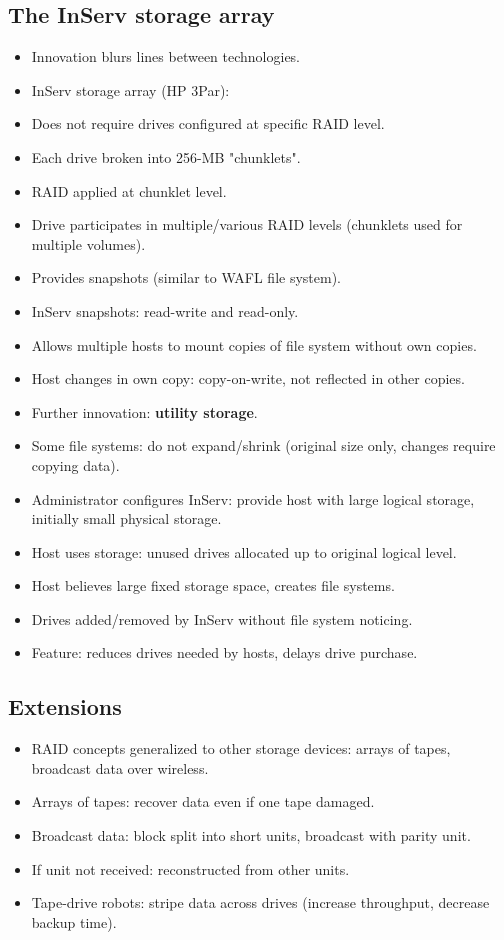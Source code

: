 \subsection{The InServ storage array}
\begin{itemize}
    \item Innovation blurs lines between technologies.
    \item InServ storage array (HP 3Par):
    \item Does not require drives configured at specific RAID level.
    \item Each drive broken into 256-MB "chunklets".
    \item RAID applied at chunklet level.
    \item Drive participates in multiple/various RAID levels (chunklets used for multiple volumes).
    \item Provides snapshots (similar to WAFL file system).
    \item InServ snapshots: read-write and read-only.
    \item Allows multiple hosts to mount copies of file system without own copies.
    \item Host changes in own copy: copy-on-write, not reflected in other copies.
    \item Further innovation: \textbf{utility storage}.
    \item Some file systems: do not expand/shrink (original size only, changes require copying data).
    \item Administrator configures InServ: provide host with large logical storage, initially small physical storage.
    \item Host uses storage: unused drives allocated up to original logical level.
    \item Host believes large fixed storage space, creates file systems.
    \item Drives added/removed by InServ without file system noticing.
    \item Feature: reduces drives needed by hosts, delays drive purchase.
\end{itemize}

\subsection{Extensions}
\begin{itemize}
    \item RAID concepts generalized to other storage devices: arrays of tapes, broadcast data over wireless.
    \item Arrays of tapes: recover data even if one tape damaged.
    \item Broadcast data: block split into short units, broadcast with parity unit.
    \item If unit not received: reconstructed from other units.
    \item Tape-drive robots: stripe data across drives (increase throughput, decrease backup time).
\end{itemize}

